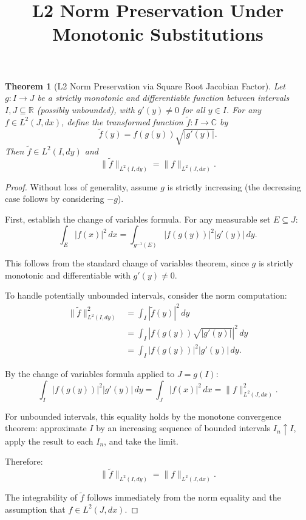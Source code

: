 \documentclass{article}
\title{L2 Norm Preservation Under Monotonic Substitutions}
\author{}
\date{}
\newtheorem{theorem}{Theorem}
\begin{document}
\maketitle

\begin{theorem}[L2 Norm Preservation via Square Root Jacobian Factor]
Let $g: I \to J$ be a strictly monotonic and differentiable function between intervals $I, J \subseteq \mathbb{R}$ (possibly unbounded), with $g'(y) \neq 0$ for all $y \in I$. For any $f \in L^2(J, dx)$, define the transformed function $\tilde{f}: I \to \mathbb{C}$ by
$$\tilde{f}(y) = f(g(y)) \sqrt{|g'(y)|}.$$
Then $\tilde{f} \in L^2(I, dy)$ and
$$\|\tilde{f}\|_{L^2(I, dy)} = \|f\|_{L^2(J, dx)}.$$
\end{theorem}

\begin{proof}
Without loss of generality, assume $g$ is strictly increasing (the decreasing case follows by considering $-g$).

First, establish the change of variables formula. For any measurable set $E \subseteq J$:
$$\int_E |f(x)|^2 \, dx = \int_{g^{-1}(E)} |f(g(y))|^2 |g'(y)| \, dy.$$

This follows from the standard change of variables theorem, since $g$ is strictly monotonic and differentiable with $g'(y) \neq 0$.

To handle potentially unbounded intervals, consider the norm computation:
\begin{align}
\|\tilde{f}\|_{L^2(I, dy)}^2 &= \int_I |\tilde{f}(y)|^2 \, dy \\
&= \int_I |f(g(y)) \sqrt{|g'(y)|}|^2 \, dy \\
&= \int_I |f(g(y))|^2 |g'(y)| \, dy.
\end{align}

By the change of variables formula applied to $J = g(I)$:
$$\int_I |f(g(y))|^2 |g'(y)| \, dy = \int_J |f(x)|^2 \, dx = \|f\|_{L^2(J, dx)}^2.$$

For unbounded intervals, this equality holds by the monotone convergence theorem: approximate $I$ by an increasing sequence of bounded intervals $I_n \uparrow I$, apply the result to each $I_n$, and take the limit.

Therefore:
$$\|\tilde{f}\|_{L^2(I, dy)} = \|f\|_{L^2(J, dx)}.$$

The integrability of $\tilde{f}$ follows immediately from the norm equality and the assumption that $f \in L^2(J, dx)$.
\end{proof}
\end{document}
